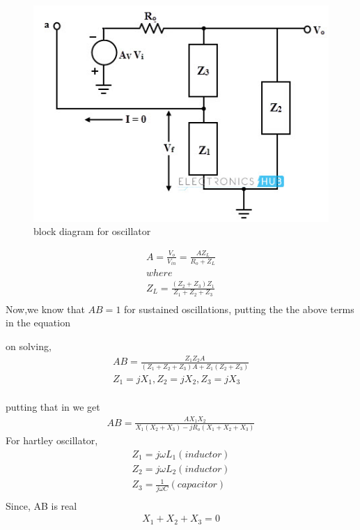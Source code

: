 \begin{enumerate}[label=\thesubsection.\arabic*.,ref=\thesubsection.\theenumi]
\begin{figure}[!ht]
\begin{center}
		\includegraphics[scale=0.8]{./figs/lc.jpg}
	\end{center}
\caption{block diagram for oscillator}
\label{fig:block2}
\end{figure}
\begin{align}
    A = \frac{V_o}{V_{in}} = \frac{AZ_L}{R_o + Z_L}\\
    where\\
    Z_L = \frac{(Z_2 + Z_3)Z_1}{Z_1+Z_2+Z_3}\\
\end{align}
Now,we know that $AB = 1$ for sustained oscillations, putting the the above terms in the equation

    on solving,\\
\begin{align}    
    AB = \frac{Z_1Z_2A}{(Z_1+Z_2+Z_3)A+ Z_1(Z_2+Z_3)}\\
    Z_1 = jX_1,
    Z_2 = jX_2,
    Z_3 = jX_3\\
\end{align}    

    putting that in we get\\
\begin{align}
AB = \frac{AX_1X_2}{X_1(X_2+X_3) -jR_o(X_1+X_2+X_3)}
\end{align}
For hartley oscillator, 
\begin{align}
    Z_1 = j\omega L_1 (inductor)\\
    Z_2 = j\omega L_2 (inductor)\\
    Z_3 = \frac{1}{j\omega C} (capacitor)\\
\end{align}
Since, AB is real
\begin{align}
    X_1+X_2+X_3 = 0\\
\end{align}


\end{enumerate}
